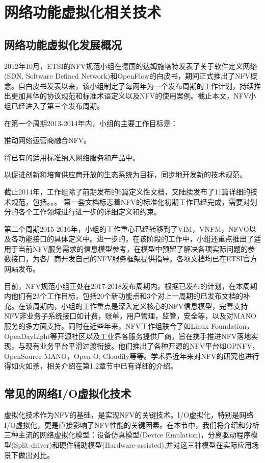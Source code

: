 \chapter{网络功能虚拟化相关技术}
\label{chap:relatedwork}

\section{网络功能虚拟化发展概况}
2012年10月，ETSI的NFV规范小组在德国的达姆施塔特发表了关于软件定义网络(SDN, Software Defined Network)和OpenFlow的白皮书，期间正式推出了NFV概念。自白皮书发表以来，该小组制定了每两年为一个发布周期的工作计划，持续推出更加具体的协议规范和标准术语定义以及NFV的使用案例。截止本文，NFV小组已经进入了第三个发布周期。

在第一个周期2013-2014年内，小组的主要工作目标是：
\begin{enumerate*}[label=\itshape\alph*)\upshape]
	\item 推动网络运营商融合NFV。
	\item 将已有的适用标准纳入网络服务和产品中。
	\item 以促进创新和培育供应商开放的生态系统为目标，同步地开发新的技术规范。
\end{enumerate*}
截止2014年，工作组除了前期发布的6篇定义性文档，又陆续发布了11篇详细的技术规范，包括。。。 第一套文档标志着NFV的标准化初期工作已经完成，需要对划分的各个工作领域进行进一步的详细定义和约束。

第二个周期2015-2016年，小组的工作重心已经转移到了VIM，VNFM，NFVO以及各功能接口的具体定义中。进一步的，在该阶段的工作中，小组还重点推出了适用于当前NFV服务需求的信息模型参考，在模型中预留了解决各项实际问题的参数接口，为各厂商开发自己的NFV服务框架提供指导。各项文档均已在ETSI官方网站发布。

目前，NFV规范小组正处在2017-2018发布周期内。根据已发布的计划，在本周期内他们有23个工作目标，包括20个新功能点和3个对上一周期的已发布文档的补充。在该周期内，小组的工作重点是深入定义核心的NFV信息模型，完善支持NFV非业务子系统接口如计费，账单，用户管理，监管，安全等，以及对MANO服务的多方面支持。同时在近些年来，NFV工作组联合了如Linux Foundation，OpenDayLight等开源社区以及工业界各服务提供厂商，旨在携手推进NFV落地实现，与现有业务平台平滑过渡衔接。他们推出了各种开源的NFV平台如OPNFV，OpenSource MANO，Open-O, Cloudify等等。学术界近年来对NFV的研究也进行得如火如荼，相关介绍在第1.2章节中已有详细的介绍。


\section{常见的网络I/O虚拟化技术}
虚拟化技术作为NFV的基础，是实现NFV的关键技术。I/O虚拟化，特别是网络I/O虚拟化，更是直接影响了NFV性能的关键因素。在本节中，我们将介绍和分析三种主流的网络虚拟化模型：设备仿真模型(Device Emulation)，分离驱动程序模型(Split-driver)和硬件辅助模型(Hardware-assisted),并对这三种模型在实际应用场景下做出对比。

